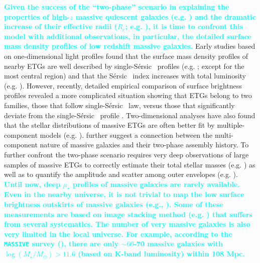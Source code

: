 \documentclass[a4paper,fleqn,usenatbib]{mnras}
\def\ser{{S\'{e}rsic\ }}
\def\logms{{$\log (M_{\star}/M_{\odot})$}}
\def\mden{{$\mu_{\star}$}}
\newcommand{\song}[1]{\textcolor{cyan}{\textbf{#1}}}
\begin{document}
    \song{
    Given the success of the ``two-phase'' scenario in explaining the properties of 
    high-$z$ massive quiescent galaxies (e.g. \citealt{vanDokkum2010, vanderWel2011,
    vandeSande2011, Belli2014}) and the dramatic increase of their effective radii 
    ($R_{\mathrm{e}}$; e.g. \citealt{Newman2012, vdWel2014}), it is time to confront 
    this model with additional observations, in particular, the detailed surface 
    mass density profiles of low redshift massive galaxies. 
    }
    Early studies based on one-dimensional light profiles found that the surface 
    mass density profiles of nearby ETGs are well described by single-\ser{} profiles 
    (e.g. \citealt{Kormendy2009}; except for the most central region) and that the 
    \ser{} index increases with total luminosity 
    (e.g. \citealt{Graham2013}). 
    However, recently, detailed empirical comparison of surface brightness profiles 
    revealed a more complicated situation showing that ETGs belong to two families, 
    those that follow single-\ser{} law, versus those that significantly deviate from 
    the single-\ser{} profile \citep{Schombert2015}.  
    Two-dimensional analyses have also found that the stellar distributions of massive 
    ETGs are often better fit by multiple-component models 
    (e.g. \citealt{Huang2013a, Oh2017}).  
    \citet{Huang2013b} further suggest a connection between the multi-component 
    nature of massive galaxies and their two-phase assembly history. 
    To further confront the two-phase scenario requires very deep observations of 
    large samples of massive ETGs to correctly estimate their total stellar masses
    (e.g. \citealt{Bernardi2013, DSouza2014}) as well as to quantify the amplitude and 
    scatter among outer envelopes (e.g. \citealt{Capaccioli2015, Iodice2016, 
    Iodice2017}).
    \song{
    Until now, deep \mden{} profiles of massive galaxies are rarely available. 
    Even in the nearby universe, it is not trivial to map the low surface
    brightness outskirts of massive galaxies (e.g., 
    \citealt{Capaccioli2015, Iodice2016, Iodice2017, Spavone2017, Mihos2017}). 
    Some of these measurements are based on image stacking method (e.g. 
    \citealt{Tal2011, dSouza2015}) that suffers from several systematics. 
    The number of very massive galaxies is also very limited in the local universe.
    For example, according to the \texttt{MASSIVE} survey (\citealt{Ma2014}), there
    are only $\sim 60$-70 massive galaxies with \logms$> 11.6$ (based on K-band 
    luminosity) within 108 Mpc.
    }
    
\end{document}
